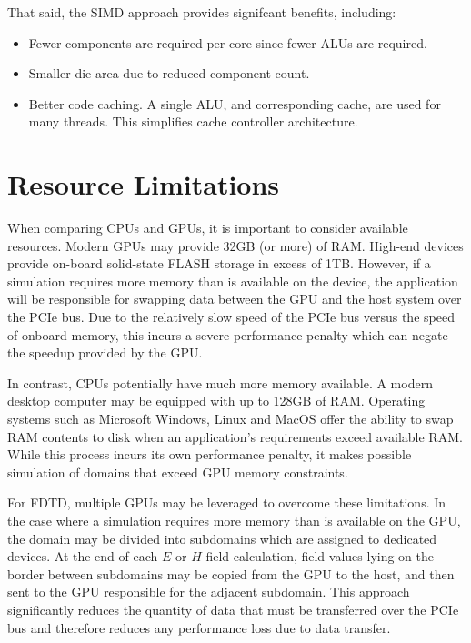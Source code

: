 That said, the SIMD approach provides signifcant benefits, including:

\begin{itemize}
	\item Fewer components are required per core since fewer ALUs are required.
	\item Smaller die area due to reduced component count.
	\item Better code caching. A single ALU, and corresponding cache, are used for many threads. This simplifies cache controller architecture.
\end{itemize}

\section{Resource Limitations}

When comparing CPUs and GPUs, it is important to consider available resources. Modern GPUs may provide 32GB (or more) of RAM.  High-end devices provide on-board solid-state FLASH storage in excess of 1TB. However, if a simulation requires more memory than is available on the device, the application will be responsible for swapping data between the GPU and the host system over the PCIe bus. Due to the relatively slow speed of the PCIe bus versus the speed of onboard memory, this incurs a severe performance penalty which can negate the speedup provided by the GPU. 

In contrast, CPUs potentially have much more memory available. A modern desktop computer may be equipped with up to 128GB of RAM. Operating systems such as Microsoft Windows, Linux and MacOS offer the ability to swap RAM contents to disk when an application's requirements exceed available RAM. While this process incurs its own performance penalty, it makes possible simulation of domains that exceed GPU memory constraints.

\iffalse
I'd like a wrapping up paragraph here to say that for the problem you are looking at GPU's make sense as a choice and why (likely get enough of them that cache memory isn't swapped often...) or some other tie back to the work.
\fi

For FDTD, multiple GPUs may be leveraged to overcome these limitations. In the case where a simulation requires more memory than is available on the GPU, the domain may be divided into subdomains which are assigned to dedicated devices. At the end of each $E$ or $H$ field calculation, field values lying on the border between subdomains may be copied from the GPU to the host, and then sent to the GPU responsible for the adjacent subdomain. This approach significantly reduces the quantity of data that must be transferred over the PCIe bus and therefore reduces any performance loss due to data transfer. 






